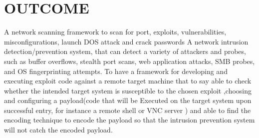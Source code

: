 \documentclass{article}
\begin{document}
\section{OUTCOME}\label{sec:into}

A network scanning  framework  to scan for port, exploits, vulnerabilities, misconfigurations, launch DOS attack and crack passwords
A network intrusion detection/prevention system, that can detect a variety of attackers and probes, such as buffer overflows, stealth port scans, web application attacks, SMB probes, and OS fingerprinting attempts. 
To have a framework for developing and executing  exploit  code against  a remote target machine  that to say able to check whether the intended target system is susceptible to the chosen exploit ,choosing and configuring a payload(code that will be Executed on the target system upon successful  entry, for instance a remote  shell or VNC server ) and able to find the encoding technique to encode  the payload so that the intrusion prevention system will not catch the encoded payload.
\end{document}
